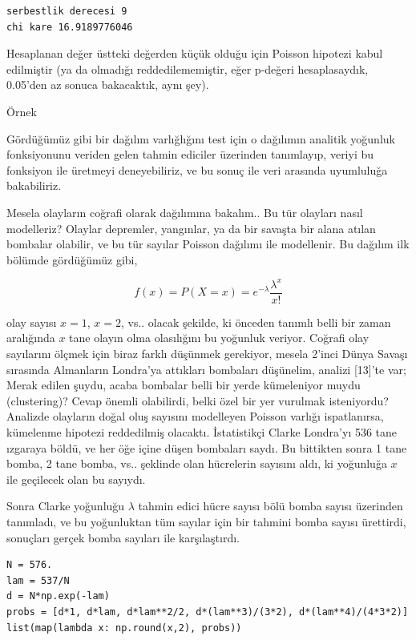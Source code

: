 \documentclass[12pt,fleqn]{article}\usepackage{../../common}
\begin{document}
\begin{verbatim}
serbestlik derecesi 9
chi kare 16.9189776046
\end{verbatim}

Hesaplanan değer üstteki değerden küçük olduğu için Poisson hipotezi kabul
edilmiştir (ya da olmadığı reddedilememiştir, eğer p-değeri hesaplasaydık,
0.05'den az sonuca bakacaktık, aynı şey). 

Örnek

Gördüğümüz gibi bir dağılım varlığlığını test için o dağılımın analitik yoğunluk
fonksiyonunu veriden gelen tahmin ediciler üzerinden tanımlayıp, veriyi bu
fonksiyon ile üretmeyi deneyebiliriz, ve bu sonuç ile veri arasında uyumluluğa
bakabiliriz.

Mesela olayların coğrafi olarak dağılımına bakalım..  Bu tür olayları nasıl
modelleriz? Olaylar depremler, yangınlar, ya da bir savaşta bir alana atılan
bombalar olabilir, ve bu tür sayılar Poisson dağılımı ile modellenir. Bu dağılım
ilk bölümde gördüğümüz gibi,

$$ f(x) = P(X=x) = e^{-\lambda}\frac{\lambda^{x}}{x!} $$

olay sayısı $x=1$, $x=2$, vs.. olacak şekilde, ki önceden tanımlı belli bir
zaman aralığında $x$ tane olayın olma olasılığını bu yoğunluk veriyor. Coğrafi
olay sayılarını ölçmek için biraz farklı düşünmek gerekiyor, mesela 2'inci Dünya
Savaşı sırasında Almanların Londra'ya attıkları bombaları düşünelim, analizi
[13]'te var; Merak edilen şuydu, acaba bombalar belli bir yerde kümeleniyor
muydu (clustering)? Cevap önemli olabilirdi, belki özel bir yer vurulmak
isteniyordu? Analizde olayların doğal oluş sayısını modelleyen Poisson varlığı
ispatlanırsa, kümelenme hipotezi reddedilmiş olacaktı. İstatistikçi Clarke
Londra'yı 536 tane ızgaraya böldü, ve her öğe içine düşen bombaları saydı. Bu
bittikten sonra 1 tane bomba, 2 tane bomba, vs.. şeklinde olan hücrelerin
sayısını aldı, ki yoğunluğa $x$ ile geçilecek olan bu sayıydı.

Sonra Clarke yoğunluğu $\lambda$ tahmin edici hücre sayısı bölü bomba sayısı
üzerinden tanımladı, ve bu yoğunluktan tüm sayılar için bir tahmini bomba
sayısı ürettirdi, sonuçları gerçek bomba sayıları ile karşılaştırdı.

\begin{verbatim}
N = 576.
lam = 537/N
d = N*np.exp(-lam)
probs = [d*1, d*lam, d*lam**2/2, d*(lam**3)/(3*2), d*(lam**4)/(4*3*2)]
list(map(lambda x: np.round(x,2), probs))
\end{verbatim}
\end{document}
